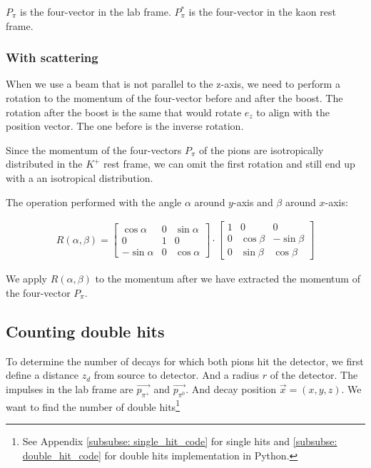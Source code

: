 \documentclass[12pt,a4paper,oneside,english]{article}
\begin{document}
		$P_{\pi}$ is the four-vector in the lab frame. $P_{\pi}^*$ is the four-vector in the kaon rest frame. 
	
	\subsubsection{With scattering}
	
		When we use a beam that is not parallel to the z-axis, we need to perform a rotation to the momentum of the four-vector before and after the boost. The rotation after the boost is the same that would rotate $e_z$ to align with the position vector. The one before is the inverse rotation.
		
		Since the momentum of the four-vectors $P_{\pi}$ of the pions are isotropically distributed in the  $K^+$ rest frame, we can omit the first rotation and still end up with a an isotropical distribution.
		
		The operation performed with the angle $\alpha$ around $y$-axis and $\beta$ around $x$-axis:
		
		\begin{align}
				R(\alpha, \beta) = \begin{bmatrix}
				\cos \alpha  & 0 & \sin \alpha \\
				0         & 1 &  0          \\
				-\sin \alpha & 0 & \cos \alpha
				\end{bmatrix} \cdot \begin{bmatrix}
				1 &   0         & 0           \\
				0 & \cos \beta & -\sin \beta \\
				0 & \sin \beta &  \cos \beta
				\end{bmatrix}
		\end{align}
		
		We apply $R(\alpha, \beta)$ to the momentum after we have extracted	the momentum of the four-vector $P_{\pi}$.
		
		\subsection{Counting double hits}
		\label{hits}
		
		To determine the number of decays for which both pions hit the detector, we first define a distance $z_d$ from source to detector. And a radius $r$ of the detector. The impulses in the lab frame are $\overrightarrow{p_{\pi^+}}$ and $\overrightarrow{p_{\pi^0}}$. And decay position $\overrightarrow{x} = (x, y, z)$. We want to find the number of double hits\footnote{See Appendix		\ref{subsubse: single_hit_code} for single hits and
		\ref{subsubse: double_hit_code} for double hits implementation in Python.}
				
\end{document}
